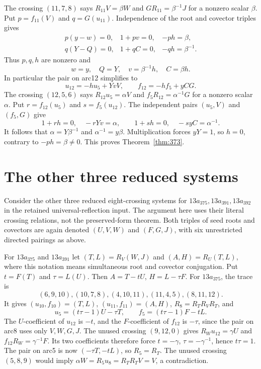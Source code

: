 \documentclass[11pt]{article}
\begin{document}
The crossing $(11,7,8)$ says
$R_{11}V=\beta W$ and $GR_{11}=\beta^{-1}J$ for a nonzero
scalar $\beta$. Put $p=f_{11}(V)$ and $q=G(u_{11})$.
Independence of the root and covector triples gives
\[
\begin{array}{lll}
p(y-w)=0,&1+pv=0,&-ph=\beta,\\
q(Y-Q)=0,&1+qC=0,&-qh=\beta^{-1}.
\end{array}
\]
Thus $p,q,h$ are nonzero and
\[
             w=y,\quad Q=Y,\quad v=\beta^{-1}h,\quad C=\beta h.
\]
In particular the pair on arc12 simplifies to
\[
                 u_{12}=-hu_5+YvV,\qquad
                 f_{12}=-hf_5+yCG.
\]
The crossing $(12,5,6)$ says
$R_{12}u_5=\alpha V$ and $f_5R_{12}=\alpha^{-1}G$
for a nonzero scalar $\alpha$.
Put $r=f_{12}(u_5)$ and $s=f_5(u_{12})$.
The independent pairs $(u_5,V)$ and $(f_5,G)$ give
\[
           1+rh=0,\quad-rYv=\alpha,\qquad
           1+sh=0,\quad-syC=\alpha^{-1}.
\]
It follows that $\alpha=Y\beta^{-1}$ and
$\alpha^{-1}=y\beta$. Multiplication forces $yY=1$, so $h=0$,
contrary to $-ph=\beta\ne0$.
This proves Theorem~\ref{thm:373}.

\section{The other three reduced systems}

Consider the other three reduced eight-crossing systems for
$13a_{375},13a_{391},13a_{392}$ in the retained universal-reflection
input. The argument here uses their literal crossing relations, not
the preserved-form theorem. Both triples of seed roots and covectors
are again denoted $(U,V,W)$ and $(F,G,J)$, with six unrestricted
directed pairings as above.

For $13a_{375}$ and $13a_{391}$ let $(T,L)=R_V(W,J)$ and
$(A,H)=R_U(T,L)$, where this notation means simultaneous root and
covector conjugation. Put $t=F(T)$ and $\tau=L(U)$. Then
$A=T-tU$, $H=L-\tau F$.
For $13a_{375}$, the trace is
\[
 (6,9,10),(10,7,8),(4,10,11),(11,4,5),(8,11,12).
\]
It gives $(u_{10},f_{10})=(T,L)$, $(u_{11},f_{11})=(A,H)$,
$R_8=R_TR_VR_T$, and
\[
 u_5=(t\tau-1)U-\tau T,\qquad
 f_5=(t\tau-1)F-tL.
\]
The $U$-coefficient of $u_{12}$ is $-t$, and the $F$-coefficient
of $f_{12}$ is $-\tau$, since the pair on arc8 uses only $V,W,G,J$.
The unused crossing $(9,12,0)$ gives
$R_Wu_{12}=\gamma U$ and $f_{12}R_W=\gamma^{-1}F$.
Its two coefficients therefore force
$t=-\gamma$, $\tau=-\gamma^{-1}$, hence $t\tau=1$.
The pair on arc5 is now $(-\tau T,-tL)$, so $R_5=R_T$.
The unused crossing $(5,8,9)$ would imply
$\alpha W=R_5u_8=R_TR_TV=V$, a contradiction.
\end{document}
